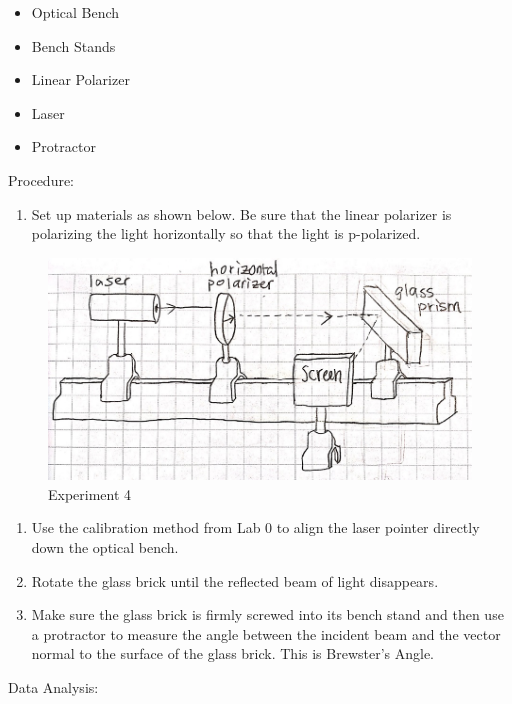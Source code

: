 \documentclass[11pt]{article}
\makeatletter
\def\maxwidth{\ifdim\Gin@nat@width>\linewidth\linewidth
    \else\Gin@nat@width\fi}
\let\Oldincludegraphics\includegraphics
\renewcommand{\includegraphics}[1]{\Oldincludegraphics[width=.8\maxwidth]{#1}}
\providecommand{\tightlist}{%
      \setlength{\itemsep}{0pt}\setlength{\parskip}{0pt}}
\makeatother
\begin{document}
\begin{itemize}
\tightlist
\item
  Optical Bench
\item
  Bench Stands
\item
  Linear Polarizer
\item
  Laser
\item
  Protractor
\end{itemize}

Procedure:

\begin{enumerate}
\def\labelenumi{\arabic{enumi}.}
\tightlist
\item
  Set up materials as shown below. Be sure that the linear polarizer is
  polarizing the light horizontally so that the light is p-polarized.
\end{enumerate}

\begin{figure}
\centering
\includegraphics{exp4.jpg}
\caption{Experiment 4}
\end{figure}

\begin{enumerate}
\def\labelenumi{\arabic{enumi}.}
\setcounter{enumi}{1}
\tightlist
\item
  Use the calibration method from Lab 0 to align the laser pointer
  directly down the optical bench.
\item
  Rotate the glass brick until the reflected beam of light disappears.
\item
  Make sure the glass brick is firmly screwed into its bench stand and
  then use a protractor to measure the angle between the incident beam
  and the vector normal to the surface of the glass brick. This is
  Brewster's Angle.
\end{enumerate}

Data Analysis:
\end{document}
